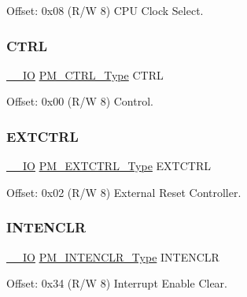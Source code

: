 Offset\+: 0x08 (R/W 8) C\+PU Clock Select. 

\mbox{\label{struct_pm_a72eccbf4a4b87a745097b449bfe78ca6}} 
\subsubsection{\texorpdfstring{CTRL}{CTRL}}
{\footnotesize\ttfamily \mbox{\hyperlink{core__cm0plus_8h_aec43007d9998a0a0e01faede4133d6be}{\+\_\+\+\_\+\+IO}} \mbox{\hyperlink{union_p_m___c_t_r_l___type}{P\+M\+\_\+\+C\+T\+R\+L\+\_\+\+Type}} C\+T\+RL}



Offset\+: 0x00 (R/W 8) Control. 

\mbox{\label{struct_pm_a8def7fea4ea7ca312401fb871f190e90}} 
\subsubsection{\texorpdfstring{EXTCTRL}{EXTCTRL}}
{\footnotesize\ttfamily \mbox{\hyperlink{core__cm0plus_8h_aec43007d9998a0a0e01faede4133d6be}{\+\_\+\+\_\+\+IO}} \mbox{\hyperlink{union_p_m___e_x_t_c_t_r_l___type}{P\+M\+\_\+\+E\+X\+T\+C\+T\+R\+L\+\_\+\+Type}} E\+X\+T\+C\+T\+RL}



Offset\+: 0x02 (R/W 8) External Reset Controller. 

\mbox{\label{struct_pm_a4093e8f9e7882b6f1fde78af8842f3d1}} 
\subsubsection{\texorpdfstring{INTENCLR}{INTENCLR}}
{\footnotesize\ttfamily \mbox{\hyperlink{core__cm0plus_8h_aec43007d9998a0a0e01faede4133d6be}{\+\_\+\+\_\+\+IO}} \mbox{\hyperlink{union_p_m___i_n_t_e_n_c_l_r___type}{P\+M\+\_\+\+I\+N\+T\+E\+N\+C\+L\+R\+\_\+\+Type}} I\+N\+T\+E\+N\+C\+LR}



Offset\+: 0x34 (R/W 8) Interrupt Enable Clear. 

\mbox{\label{struct_pm_a9030958ab507497c2d8a0b97e18ba7cf}} 
